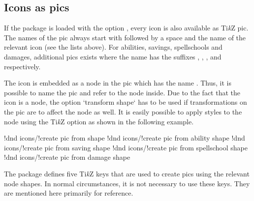 \documentclass[a4paper]{article}
\begin{document}
\begin{codeexample}
\end{codeexample}

\subsection{Icons as pics}\label{sec:pics}

If the package is loaded with the option , every icon is also available as Ti\emph{k}Z pic. The names of the pic always start with  followed by a space and the name of the relevant icon (see the lists above). For abilities, savings, spellschools and damages, additional pics exists where the name has the suffixes , , , and  respectively.

The icon is embedded as a node in the pic which has the name . Thus, it is possible to name the pic and refer to the node inside. Due to the fact that the icon is a node, the option `transform shape` has to be used if transformations on the pic are to affect the node as well. It is easily possible to apply styles to the node using the Ti\emph{k}Z option  as shown in the following example.

\begin{codeexample}
\end{codeexample}

\begin{macrodef}
!dnd icons/!create pic from shape
!dnd icons/!create pic from ability shape
!dnd icons/!create pic from saving shape 
!dnd icons/!create pic from spellschool shape
!dnd icons/!create pic from damage shape
\end{macrodef}
The package defines five Ti\emph{k}Z keys that are used to create pics using the relevant node shapes. In normal circumstances, it is not necessary to use these keys. They are mentioned here primarily for reference. 
\end{document}
